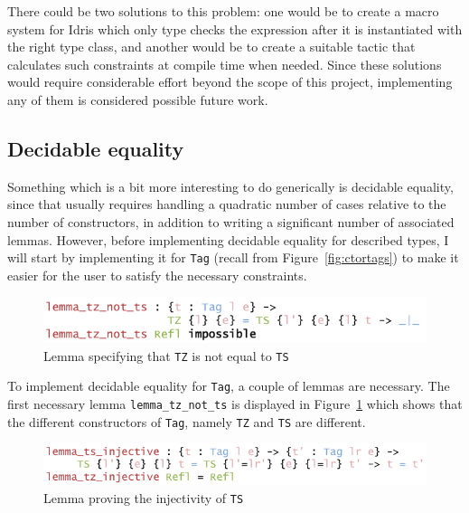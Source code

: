 \documentclass{ituthesis}
\newcommand{\ttconstructor}[1]{\textcolor{constructor-color}{\texttt{#1}}}
\newcommand{\tttype}[1]{\textcolor{type-color}{\texttt{#1}}}
\newcommand{\ttdec}[1]{\textcolor{declared-var-color}{\texttt{#1}}}
\theoremstyle{break}
\begin{document}
There could be two solutions to this problem: one would be to create a macro system for Idris which only type checks the expression after it is instantiated with the right type class, and another
would be to create a suitable tactic that calculates such constraints at compile time when needed.
Since these solutions would require considerable effort beyond the scope of this project, implementing any of them is considered possible future work.


\subsection{Decidable equality}
\label{sub:Decidable equality}
Something which is a bit more interesting to do generically is decidable equality, since that usually
requires handling a quadratic number of cases relative to the number of constructors, in addition to writing a significant number of associated lemmas.
However, before implementing decidable equality for described types, I will start by implementing it for \tttype{Tag} (recall from Figure~\ref{fig:ctortags}) to make it easier for the user to satisfy
the necessary constraints.

\begin{figure}[ht]
\begin{center}
    \includegraphics[scale=0.5]{Figures/TagDecEqLemma1.png}
\end{center}
\caption{Lemma specifying that \ttconstructor{TZ} is not equal to \ttconstructor{TS}}
\label{fig:taglem1}
\end{figure}

To implement decidable equality for \tttype{Tag}, a couple of lemmas are necessary.
The first necessary lemma \ttdec{lemma\_tz\_not\_ts} is displayed in Figure~\ref{fig:taglem1} which shows that the different constructors of \tttype{Tag}, namely \ttconstructor{TZ} and \ttconstructor{TS} are different.

\begin{figure}[ht]
\begin{center}
    \includegraphics[scale=0.5]{Figures/TagDecEqLemma2.png}
\end{center}
\caption{Lemma proving the injectivity of \ttconstructor{TS}}
\label{fig:taglem2}
\end{figure}
\end{document}
